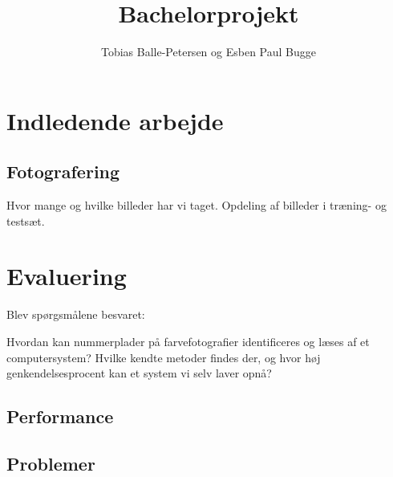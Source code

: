 \documentclass[11pt,a4paper,final]{report}
\author{Tobias Balle-Petersen og Esben Paul Bugge}
\title{Bachelorprojekt}
\begin{document}
\maketitle

\tableofcontents
\newpage

\section{Indledende arbejde}
\subsection{Fotografering}
Hvor mange og hvilke billeder har vi taget.
Opdeling af billeder i træning- og testsæt.





\section{Evaluering}


Blev spørgsmålene besvaret:

Hvordan kan nummerplader på farvefotografier identificeres og læses af et computersystem? Hvilke kendte metoder findes der, og hvor høj genkendelsesprocent kan et system vi selv laver opnå?

\subsection{Performance}
\subsection{Problemer}


\newpage %

\end{document}
